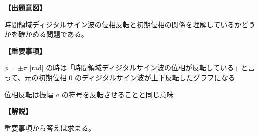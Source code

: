 \noindent \textbf{【出題意図】}

\noindent 時間領域ディジタルサイン波の位相反転と初期位相の関係を理解しているかどうかを確かめる問題である。

\vspace{1em}
\noindent \textbf{【重要事項】}

\bigskip
\noindent  $\phi = \pm\pi$ [rad] の時は「時間領域ディジタルサイン波の位相が反転している」と言って、元の初期位相 $0$ のディジタルサイン波が上下反転したグラフになる

\bigskip
\noindent  位相反転は振幅 $a$ の符号を反転させることと同じ意味


\vspace{1em}
\noindent \textbf{【解説】}

\noindent 重要事項から答えは求まる。
